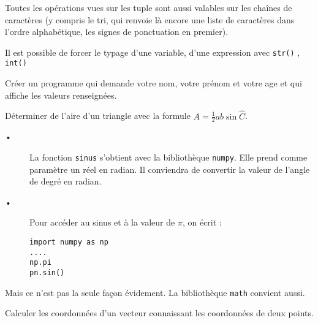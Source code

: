Toutes les opérations vues sur les tuple sont aussi valables sur les chaînes de caractères (y compris le tri, qui renvoie là
encore une liste de caractères dans l’ordre alphabétique, les signes de ponctuation en premier).



\begin{Rq}
Il est possible de forcer le typage d'une variable, d'une expression avec \texttt{str()} ,  \texttt{int()} 
\end{Rq}



\begin{ExD}

Créer un programme qui demande votre nom, votre prénom et votre age et qui affiche les valeurs renseignées.
\end{ExD}

\begin{ExD}

Déterminer de l’aire d’un triangle avec la formule $A =\frac12 ab \sin \widehat{C}$.
\end{ExD}

\begin{Rqs}
\begin{description}
\item[•] La fonction \texttt{sinus} s'obtient avec la bibliothèque \texttt{numpy}. Elle prend comme paramètre un réel en radian. Il conviendra de convertir la valeur de l'angle de degré en radian.
\item[•] Pour accéder au sinus et à la valeur de $\pi$, on écrit :

\begin{lstlisting}
import numpy as np
....  
np.pi
pn.sin()
\end{lstlisting}
\end{description}

Mais ce n'est pas la seule façon évidement. La bibliothèque \texttt{math} convient aussi.

\end{Rqs}

\begin{ExD}

Calculer les coordonnées d'un vecteur  connaissant les coordonnées de deux points.
\end{ExD}



